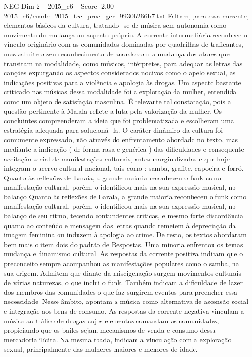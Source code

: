 \begin{textsample}{NEG Dim 2 – 2015\_c6 – Score -2.00 – 2015\_c6/enade\_2015\_tec\_proc\_ger\_9930b266b7.txt}
Faltam, para essa corrente, elementos básicos da cultura, tratando -se de música sem autonomia como movimento de mudança ou aspecto próprio.
A corrente intermediária reconhece o vínculo originário com as comunidades dominadas por quadrilhas de traficantes, mas admite o seu reconhecimento de acordo com a mudança dos atores que transitam na modalidade, como músicos, intérpretes, para adequar as letras das canções expurgando os aspectos considerados nocivos como o apelo sexual, as indicações positivas para a violência e apologia às drogas.
Um aspecto bastante criticado nas músicas dessa modalidade foi a exploração da mulher, entendida como um objeto de satisfação masculina.
É relevante tal constatação, pois a questão pertinente à Malala reflete a luta pela valorização da mulher.
Os concluintes compreenderam a ideia que foi problematizada e escolheram uma estratégia adequada para solucioná -la.
O caráter dinâmico da cultura foi comumente expressado, não através do enfrentamento abordado no texto, mas mediante a indicação ( de forma rasa e genérica ) das dificuldades e consequente aceitação social de manifestações culturais, antes marginalizadas e que hoje integram o acervo cultural nacional, tais como : samba, grafite, capoeira e forró.
Quanto às reflexões de Laraia, a grande maioria reconheceu o funk como manifestação cultural, porém, o identificou mais na sua expressão musical, no balanço Quanto às reflexões de Laraia, a grande maioria reconheceu o funk como manifestação cultural, porém, o identificou mais na sua expressão musical, no balanço de seu ritmo, tecendo contundentes críticas, e mesmo forte discordância quanto ao conteúdo e mensagem das letras quando remetem à depreciação da imagem feminina ou induzem à apologia ao crime.
De resto, os textos abordaram bem mais o item dois do padrão de Respostas.
Uma minoria enfrentou os temas mudança e dinamismo cultural.
As respostas da corrente positiva indicam que o preconceito sempre acompanhou as manifestações populares como o samba, na sua origem.
Admitem que diante da miscigenação surgem movimentos culturais de várias naturezas, o que inclui o funk.
Também indicam a dificuldade de lazer dos membros das comunidades o que faz surgirem eventos para preencher essa necessidade.
Nesse âmbito, apontam a música como alternativa de ascensão social e integração aos bens de consumo.
As respostas da corrente negativa vinculam a música ao tráfico de drogas cujos elementos comandam as comunidades, propiciando que os bailes sejam mecanismos de venda e consumo dessa mercadoria ilícita.
Na mesma toada, indicam a vinculação com a exploração sexual, principalmente das mulheres maiores e menores de idade.

\end{textsample}

